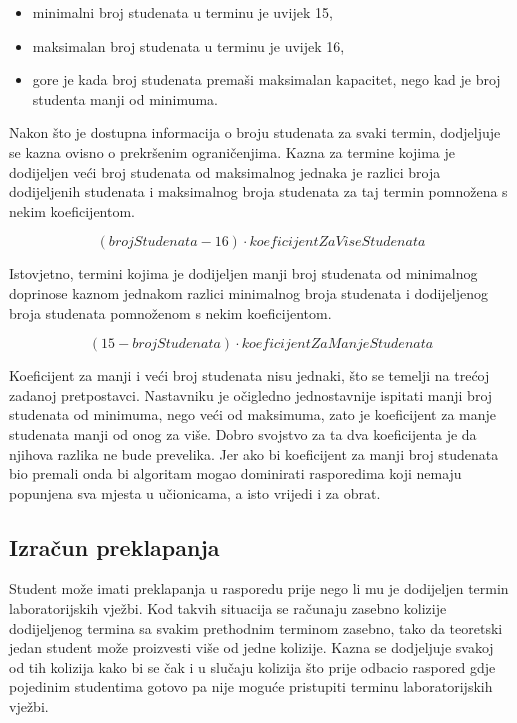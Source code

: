 \documentclass[times, utf8, zavrsni]{fer}
\begin{document}
\begin{itemize}
	\item minimalni broj studenata u terminu je uvijek 15,
	\item maksimalan broj studenata u terminu je uvijek 16,
	\item gore je kada broj studenata premaši maksimalan kapacitet, nego kad je broj studenta manji od minimuma.
\end{itemize}

Nakon što je dostupna informacija o broju studenata za svaki termin, dodjeljuje se kazna ovisno o prekršenim ograničenjima. Kazna za termine kojima je dodijeljen veći broj studenata od maksimalnog jednaka je razlici broja dodijeljenih studenata i maksimalnog broja studenata za taj termin pomnožena s nekim koeficijentom.

\begin{equation}
(brojStudenata - 16) \cdot koeficijentZaViseStudenata
\label{eq:max-studenta}
\end{equation}

Istovjetno, termini kojima je dodijeljen manji broj studenata od minimalnog doprinose kaznom jednakom razlici minimalnog broja studenata i dodijeljenog broja studenata pomnoženom s nekim koeficijentom.

\begin{equation}
(15 - brojStudenata) \cdot koeficijentZaManjeStudenata
\label{eq:min-studenta}
\end{equation}

Koeficijent za manji i veći broj studenata nisu jednaki, što se temelji na trećoj zadanoj pretpostavci. Nastavniku je očigledno jednostavnije ispitati manji broj studenata od minimuma, nego veći od maksimuma, zato je koeficijent za manje studenata manji od onog za više. Dobro svojstvo za ta dva koeficijenta je da njihova razlika ne bude prevelika. Jer ako bi koeficijent za manji broj studenata bio premali onda bi algoritam mogao dominirati rasporedima koji nemaju popunjena sva mjesta u učionicama, a isto vrijedi i za obrat.

\subsection{Izračun preklapanja}

Student može imati preklapanja u rasporedu prije nego li mu je dodijeljen termin laboratorijskih vježbi. Kod takvih situacija se računaju zasebno kolizije dodijeljenog termina sa svakim prethodnim terminom zasebno, tako da teoretski jedan student može proizvesti više od jedne kolizije. Kazna se dodjeljuje svakoj od tih kolizija kako bi se čak i u slučaju kolizija što prije odbacio raspored gdje pojedinim studentima gotovo pa nije moguće pristupiti terminu laboratorijskih vježbi.
\end{document}
